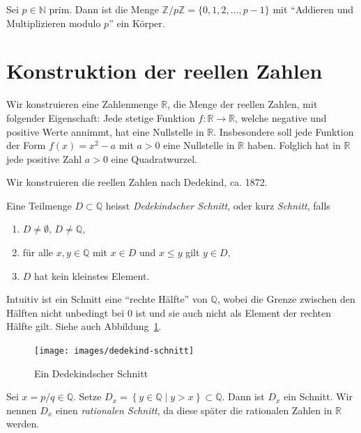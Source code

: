 \documentclass[../main.tex]{subfiles}
\begin{document}
\begin{ausblick}[Algebra]
  Sei $p \in \mathbb N$ prim. Dann ist die Menge
  \( \mathbb Z / p \mathbb Z = \{0, 1, 2, \dots, p-1\}\)
  mit ``Addieren und Multiplizieren modulo $p$'' ein Körper.
\end{ausblick}

\section{Konstruktion der reellen Zahlen}
\begin{goal}
  Wir konstruieren eine Zahlenmenge $\mathbb R$,
  die Menge der reellen Zahlen, mit folgender
  Eigenschaft: Jede stetige Funktion $f \colon \mathbb R \to \mathbb R$,
  welche negative und positive Werte annimmt, hat eine Nullstelle
  in $\mathbb R$. Insbesondere soll jede Funktion
  der Form $f(x)=x^{2}-a$ mit $a>0$ eine Nullstelle in $\mathbb R$
  haben. Folglich hat in $\mathbb R$ jede positive Zahl
  $a > 0$ eine Quadratwurzel.
\end{goal}

Wir konstruieren die reellen Zahlen nach Dedekind, ca. 1872.
\begin{definition}
  Eine Teilmenge $D \subset \mathbb Q$ heisst
  \emph{Dedekindscher Schnitt}, oder kurz \emph{Schnitt},
  falls
  \begin{enumerate}[(1)]
    \item $D \neq \emptyset$, $D \neq \mathbb Q$,
    \item für alle $x, y \in \mathbb Q$ mit $x \in D$ und $x \leq y$ gilt $y \in D$,
    \item $D$ hat kein kleinstes Element.
  \end{enumerate}
\end{definition}

Intuitiv ist ein Schnitt eine ``rechte Hälfte'' von $\mathbb Q$, wobei
die Grenze
zwischen den Hälften
nicht unbedingt bei $0$ ist und sie auch nicht als Element der
rechten Hälfte gilt. Siehe auch Abbildung~\ref{fig:schnitt}.

\begin{figure}[htb]
  \centering
  \texttt{[image: images/dedekind-schnitt]}
  \caption{Ein Dedekindscher Schnitt}%
  \label{fig:schnitt}
\end{figure}

\begin{example}
  Sei $x = p/q \in \mathbb Q$. Setze $D_{x} = \left\{y \in \mathbb Q \mid y > x\right\}
  \subset \mathbb Q$.
  Dann ist $D_{x}$ ein Schnitt. Wir nennen $D_{x}$ einen \emph{rationalen Schnitt},
  da diese später die rationalen Zahlen in $\mathbb R$ werden.
\end{example}
\end{document}
